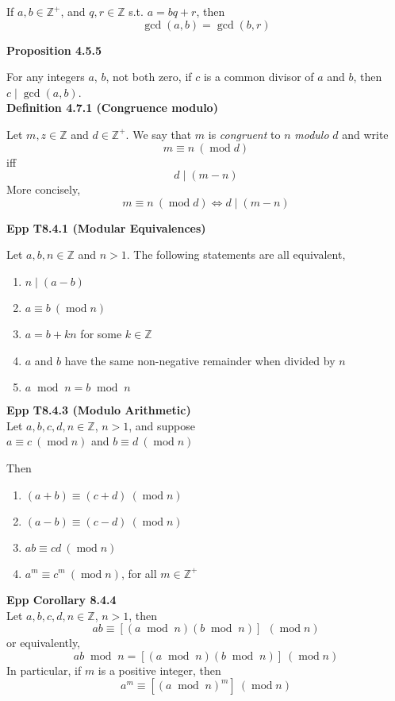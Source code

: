 \documentclass[a4paper]{article}
\newcommand{\subheading}[1]{{\scriptsize\textbf{#1}}}
\renewcommand\mod{\;\operatorname{mod}\;}  %
\newcommand\undermod[1]{\ (\operatorname{mod}#1)}
\begin{document}
\begin{multicols*}{4}
If $a, b \in \mathbb{Z}^+$, and $q, r \in \mathbb{Z}$ s.t. $a = bq + r$, then
$$\gcd(a, b)= \gcd(b, r)$$

\subheading{Proposition 4.5.5}

For any integers $a$, $b$, not both zero, if $c$ is a common divisor of $a$ and
$b$, then $c\;|\;\gcd(a,b)$.\\


\subheading{Definition 4.7.1 (Congruence modulo)}

Let $m, z \in \mathbb{Z}$ and $d \in \mathbb{Z}^+$. We say that $m$ is
\textit{congruent} to $n$ \textit{modulo} $d$ and write
$$ m \equiv n \undermod{d} $$
iff
$$ d\;|\;(m-n) $$
More concisely,
$$ m \equiv n \undermod{d} \iff d\;|\;(m-n) $$

\subheading{Epp T8.4.1 (Modular Equivalences)}

Let $a, b, n \in \mathbb{Z}$ and $n > 1$. The following statements are all
equivalent,
\begin{enumerate} \itemsep -0.5em
    \item $n\;|\;(a-b)$
    \item $a \equiv b \undermod{n}$
    \item $a = b + kn$ for some $k \in \mathbb{Z}$
    \item $a$ and $b$ have the same non-negative remainder when divided by $n$
    \item $a \mod n = b \mod n$
\end{enumerate}

\subheading{Epp T8.4.3 (Modulo Arithmetic)}\\
Let $a, b, c, d, n \in \mathbb{Z}$, $n > 1$, and suppose\\

{\centering
  $a \equiv c \undermod{n}$ and $b \equiv d \undermod{n}$\\
}

Then

\begin{enumerate} \itemsep -0.5em
  \item $(a + b) \equiv (c + d) \undermod{n}$
  \item $(a - b) \equiv (c - d) \undermod{n}$
  \item $ab \equiv cd \undermod{n}$
  \item $a^m \equiv c^m \undermod{n}$, for all $m \in \mathbb{Z}^+$
\end{enumerate}

\subheading{Epp Corollary 8.4.4}\\
Let $a, b, c, d, n \in \mathbb{Z}$, $n > 1$, then
$$ ab \equiv [(a \mod n)(b \mod n)]\ \undermod{n} $$
or equivalently,
$$ ab \mod n = [(a \mod n)(b \mod n)] \undermod{n} $$
In particular, if $m$ is a positive integer, then
$$ a^m \equiv [(a \mod n)^m] \undermod{n} $$


\end{multicols*}
\end{document}
